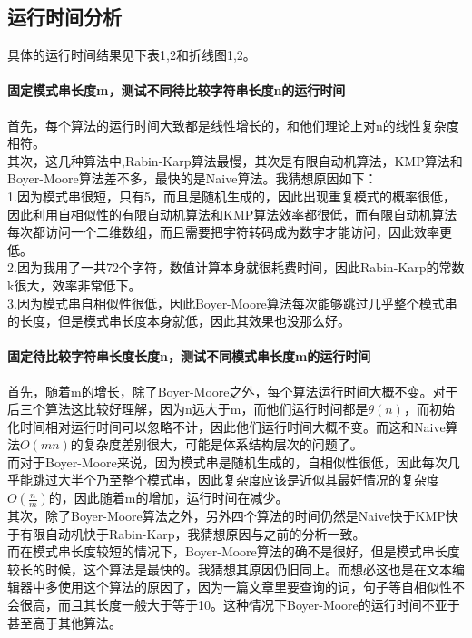 \documentclass{article}
\begin{document}
\begin{CJK}{UTF8}{gkai}
\subsection{运行时间分析}
具体的运行时间结果见下表1,2和折线图1,2。\\
\paragraph{固定模式串长度m，测试不同待比较字符串长度n的运行时间}
首先，每个算法的运行时间大致都是线性增长的，和他们理论上对n的线性复杂度相符。\\
其次，这几种算法中,Rabin-Karp算法最慢，其次是有限自动机算法，KMP算法和Boyer-Moore算法差不多，最快的是Naive算法。我猜想原因如下：\\
1.因为模式串很短，只有5，而且是随机生成的，因此出现重复模式的概率很低，因此利用自相似性的有限自动机算法和KMP算法效率都很低，而有限自动机算法每次都访问一个二维数组，而且需要把字符转码成为数字才能访问，因此效率更低。\\
2.因为我用了一共72个字符，数值计算本身就很耗费时间，因此Rabin-Karp的常数k很大，效率非常低下。\\
3.因为模式串自相似性很低，因此Boyer-Moore算法每次能够跳过几乎整个模式串的长度，但是模式串长度本身就低，因此其效果也没那么好。\\
\paragraph{固定待比较字符串长度长度n，测试不同模式串长度m的运行时间}
首先，随着m的增长，除了Boyer-Moore之外，每个算法运行时间大概不变。对于后三个算法这比较好理解，因为n远大于m，而他们运行时间都是$\theta(n)$，而初始化时间相对运行时间可以忽略不计，因此他们运行时间大概不变。而这和Naive算法$O(mn)$的复杂度差别很大，可能是体系结构层次的问题了。\\
而对于Boyer-Moore来说，因为模式串是随机生成的，自相似性很低，因此每次几乎能跳过大半个乃至整个模式串，因此复杂度应该是近似其最好情况的复杂度$O(\frac{n}{m})$的，因此随着m的增加，运行时间在减少。\\
其次，除了Boyer-Moore算法之外，另外四个算法的时间仍然是Naive快于KMP快于有限自动机快于Rabin-Karp，我猜想原因与之前的分析一致。\\
而在模式串长度较短的情况下，Boyer-Moore算法的确不是很好，但是模式串长度较长的时候，这个算法是最快的。我猜想其原因仍旧同上。而想必这也是在文本编辑器中多使用这个算法的原因了，因为一篇文章里要查询的词，句子等自相似性不会很高，而且其长度一般大于等于10。这种情况下Boyer-Moore的运行时间不亚于甚至高于其他算法。\\
\begin{table}[!htbp] 
	

\end{table}
\end{CJK}
\end{document}
